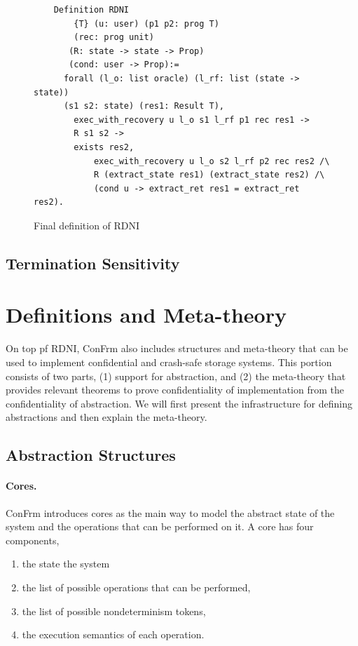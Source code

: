 \begin{figure}[ht]
    \centering
    \begin{verbatim}
    Definition RDNI
        {T} (u: user) (p1 p2: prog T) 
        (rec: prog unit)
       (R: state -> state -> Prop) 
       (cond: user -> Prop):=
      forall (l_o: list oracle) (l_rf: list (state -> state))
      (s1 s2: state) (res1: Result T),
        exec_with_recovery u l_o s1 l_rf p1 rec res1 ->
        R s1 s2 ->
        exists res2,
            exec_with_recovery u l_o s2 l_rf p2 rec res2 /\
            R (extract_state res1) (extract_state res2) /\
            (cond u -> extract_ret res1 = extract_ret res2).
    \end{verbatim}
    \caption{Final definition of RDNI}
    \label{fig:RDNI_final}
\end{figure}


{\color{red}
\subsection{Termination Sensitivity}}

\section{Definitions and Meta-theory}
On top pf RDNI, ConFrm also includes structures and meta-theory that can be used to implement confidential and crash-safe storage systems. This portion consists of two parts, (1) support for abstraction, and (2) the meta-theory that provides relevant theorems to prove confidentiality of implementation from the confidentiality of abstraction. We will first present the infrastructure for defining abstractions and then explain the meta-theory.

\subsection{Abstraction Structures}
\paragraph{Cores.}
ConFrm introduces cores as the main way to model the abstract state of the system and the operations that can be performed on it. A core has four components,
\begin{enumerate}
    \item the state the system
    \item the list of possible operations that can be performed,
    \item the list of possible nondeterminism tokens,
    \item the execution semantics of each operation.
\end{enumerate}

